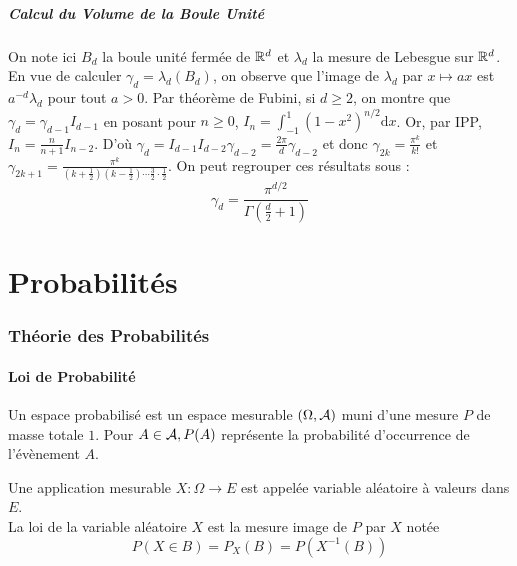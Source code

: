 \documentclass{cours}
\begin{document}
        \subsubsection{Calcul du Volume de la Boule Unité}
        On note ici $B_{d}$ la boule unité fermée de $\mathbb{R}^{d}$ et $\lambda_{d}$ la mesure de Lebesgue sur $\mathbb{R}^{d}$. En vue de calculer $\gamma_{d} = \lambda_{d}\left(B_{d}\right)$, on observe que l'image de $\lambda_{d}$ par $x \mapsto ax$ est $a^{-d}\lambda_{d}$ pour tout $a > 0$.
        Par théorème de Fubini, si $d \geq 2$, on montre que $\gamma_{d} = \gamma_{d-1} I_{d-1}$ en posant pour $n \geq 0$, $I_{n} = \int_{-1}^{1}\left(1 - x^{2}\right)^{n/2}\mathrm{d}x$.
        Or, par IPP, $I_{n} = \frac{n}{n + 1}I_{n-2}$. D'où $\gamma_{d} = I_{d-1}I_{d-2}\gamma_{d-2} = \frac{2\pi}{d}\gamma_{d-2}$ et donc $\gamma_{2k} = \frac{\pi^{k}}{k!}$ et $\gamma_{2k+1} = \frac{\pi^{k}}{\left(k + \frac{1}{2}\right)\left(k - \frac{1}{2}\right)\cdots \frac{3}{2}\cdot\frac{1}{2}}$.
        On peut regrouper ces résultats sous : 
        \[
            \gamma_{d} = \frac{\pi^{d/2}}{\Gamma\left(\frac{d}{2} + 1\right)}
        \]
        


    \part{Probabilités}
    \section{Théorie des Probabilités}
    \subsection{Loi de Probabilité}
    \begin{definition}
        Un espace probabilisé est un espace mesurable $\left(\Omega, \mathcal{A}\right)$ muni d'une mesure $P$ de masse totale $1$. Pour $A\in \mathcal{A}, P(A)$ représente la probabilité d'occurrence de l'évènement $A$. 
    \end{definition}

    \begin{definition}
        Une application mesurable $X : \Omega \rightarrow E$ est appelée variable aléatoire à valeurs dans $E$. \\
        La loi de la variable aléatoire $X$ est la mesure image de $P$ par $X$ notée
        \[
            P(X\in B) = P_{X}(B)= P\left(X^{-1}(B)\right)
        \]
    \end{definition}
\end{document}

